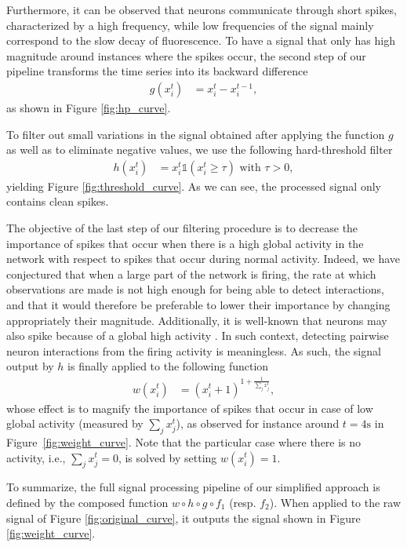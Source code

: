\documentclass[wcp]{jmlr}
\begin{document}
Furthermore, it can be observed that neurons communicate through short spikes, characterized by a high
frequency, while low frequencies of the signal mainly correspond to the slow
decay of fluorescence. To have a signal that only has high magnitude around instances where the spikes occur, the second step of our pipeline transforms the time series into its backward
difference
\begin{align}
g(x^{t}_{i}) &= x^{t}_i - x^{t-1}_i, \label{eq:high-pass-filter}
\end{align}
as shown in Figure \ref{fig:hp_curve}.

To filter out small variations in the signal obtained after applying the
function $g$ as well as to eliminate negative values, we use the following
hard-threshold filter
\begin{align}\label{eqn:hfilter}
h(x^{t}_i) &= x^{t}_i \mathbb{1}(x^{t}_i \geq \tau) \text{ with } \tau > 0,
\end{align}
yielding Figure \ref{fig:threshold_curve}.
As we can see, the processed signal only contains clean spikes.

The objective of the last step of our filtering procedure is to decrease the
importance of spikes that occur when there is a high global activity in the
network with respect to  spikes that occur during normal activity. Indeed, we
have conjectured that when a large part of the network is firing, the rate at
which observations are made is not high enough for being able to detect
interactions, and that it would therefore be preferable to lower their
importance by changing appropriately their magnitude. Additionally, it is
well-known that neurons may also spike because of a global high activity
\citep{stetter2012model}. In such  context, detecting pairwise neuron
interactions from the firing activity is meaningless. As such,
the signal output by $h$ is finally applied to the following function
\begin{align}
 w(x^{t}_i) &= (x^{t}_i + 1 )^{1 + \frac{1}{\sum_{j} x^{t}_j}}, \label{eq:magnify-filter}
\end{align}
whose effect is to magnify the importance of spikes that occur in case of low
global activity (measured by $\sum_{j} x^{t}_j$), as observed for instance
around $t=4\text{s}$ in Figure~\ref{fig:weight_curve}. Note that the particular case where there
is no activity, i.e., $\sum_{j} x^{t}_j = 0$, is solved by setting $w(x^{t}_i)
= 1$.

To summarize, the full signal processing pipeline of our simplified approach is defined by the composed function $w \circ h \circ g \circ
f_1$ (resp. $f_2$). When applied to the raw signal of Figure
\ref{fig:original_curve}, it outputs the signal shown in Figure
\ref{fig:weight_curve}.
\end{document}
